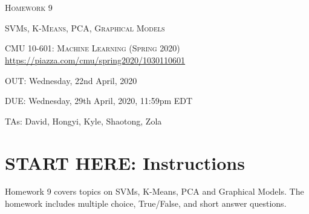 \documentclass[12pt]{article}
\begin{document}
\section*{}
\begin{center}
  \centerline{\textsc{\LARGE  Homework 9}}
  \vspace{0.5em}
  \centerline{\textsc{\LARGE SVMs, K-Means, PCA, Graphical Models}}
  \textsc{\large CMU 10-601: Machine Learning (Spring 2020)} \\
  \url{https://piazza.com/cmu/spring2020/1030110601}
  \centerline{OUT: Wednesday, 22nd April, 2020}
  \centerline{DUE: Wednesday, 29th April, 2020, 11:59pm EDT}
    \centerline{TAs: David, Hongyi, Kyle, Shaotong, Zola}
\end{center}


\section*{START HERE: Instructions}

\begin{notebox}
Homework 9 covers topics on SVMs, K-Means, PCA and Graphical Models. The homework includes multiple choice, True/False, and short answer questions. 
\end{notebox}
\end{document}
